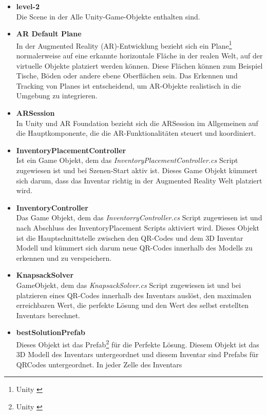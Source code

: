 \begin{itemize}
    \item \textbf{level-2}\\
    Die Scene in der Alle Unity-Game-Objekte enthalten sind.
    \item \textbf{AR Default Plane}\\
    In der Augmented Reality (AR)-Entwicklung bezieht sich ein Plane\footnote{Unity \cite{Plane}} normalerweise
    auf eine erkannte horizontale Fläche in der realen Welt, auf der virtuelle Objekte platziert werden können. Diese
    Flächen können zum Beispiel Tische, Böden oder andere ebene Oberflächen sein. Das Erkennen und Tracking von Planes
    ist entscheidend, um AR-Objekte realistisch in die Umgebung zu integrieren.
    \item \textbf{ARSession}\\
    In Unity und AR Foundation bezieht sich die ARSession im Allgemeinen auf die Hauptkomponente, die die AR-Funktionalitäten
    steuert und koordiniert.
    \item \textbf{InventoryPlacementController}\\
    Ist ein Game Objekt, dem das \textit{InventoryPlacementController.cs} Script zugewiesen ist und
    bei Szenen-Start aktiv ist. Dieses Game Objekt kümmert sich darum, dass das Inventar richtig in der Augmented Reality
    Welt platziert wird.
    \item \textbf{InventoryController}\\
    Das Game Objekt, dem das \textit{InventorryController.cs} Script zugewiesen ist und nach Abschluss des InventoryPlacement
    Scripts aktiviert wird. Dieses Objekt ist die Hauptschnittstelle zwischen den QR-Codes und dem 3D Inventar Modell und
    kümmert sich darum neue QR-Codes innerhalb des Modells zu erkennen und zu verspeichern.
    \item \textbf{KnapsackSolver}\\
    GameObjekt, dem das \textit{KnapsackSolver.cs} Script zugewiesen ist und bei platzieren eines QR-Codes innerhalb des
    Inventars auslöst, den maximalen erreichbaren Wert, die perfekte Lösung und den Wert des selbst erstellten Inventars
    berechnet.
    \item \textbf{bestSolutionPrefab}\\
    Dieses Objekt ist das Prefab\footnote{Unity \cite{Prefab}} für die Perfekte Lösung. Diesem Objekt ist das 3D Modell
    des Inventars untergeordnet und diesem Inventar sind Prefabs für QRCodes untergeordnet. In jeder Zelle des Inventars

\end{itemize}
